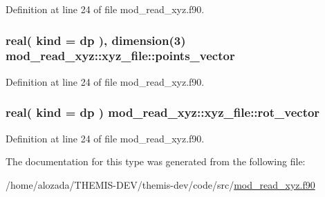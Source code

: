 Definition at line 24 of file mod\+\_\+read\+\_\+xyz.\+f90.

\subsubsection[{\texorpdfstring{points\+\_\+vector}{points_vector}}]{\setlength{\rightskip}{0pt plus 5cm}real( kind = dp ), dimension(3) mod\+\_\+read\+\_\+xyz\+::xyz\+\_\+file\+::points\+\_\+vector}\hypertarget{structmod__read__xyz_1_1xyz__file_a333fe3200ebdabc41ff195c6b0a91932}{}\label{structmod__read__xyz_1_1xyz__file_a333fe3200ebdabc41ff195c6b0a91932}


Definition at line 24 of file mod\+\_\+read\+\_\+xyz.\+f90.

\subsubsection[{\texorpdfstring{rot\+\_\+vector}{rot_vector}}]{\setlength{\rightskip}{0pt plus 5cm}real( kind = dp ) mod\+\_\+read\+\_\+xyz\+::xyz\+\_\+file\+::rot\+\_\+vector}\hypertarget{structmod__read__xyz_1_1xyz__file_ab662f528be048fc7efd32495633a246b}{}\label{structmod__read__xyz_1_1xyz__file_ab662f528be048fc7efd32495633a246b}


Definition at line 24 of file mod\+\_\+read\+\_\+xyz.\+f90.



The documentation for this type was generated from the following file\+:\begin{DoxyCompactItemize}
\item 
/home/alozada/\+T\+H\+E\+M\+I\+S-\/\+D\+E\+V/themis-\/dev/code/src/\hyperlink{mod__read__xyz_8f90}{mod\+\_\+read\+\_\+xyz.\+f90}\end{DoxyCompactItemize}
